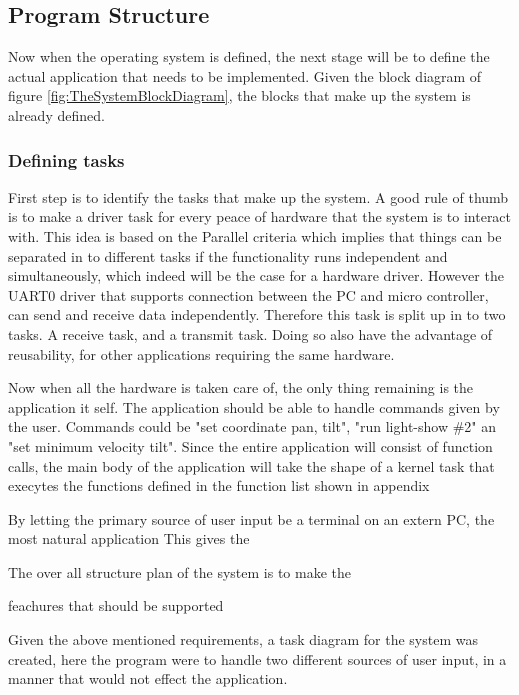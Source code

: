 

\subsection{Program Structure}
\label{sec:ProgramStructure}

Now when the operating system is defined, the next stage will be to define the actual application that needs to be implemented. Given the block diagram of figure \ref{fig:TheSystemBlockDiagram}, the blocks that make up the system is already defined.

\subsubsection{Defining tasks}
\label{sec:DefiningTasks}
First step is to identify the tasks that make up the system. A good rule of thumb is to make a driver task for every peace of hardware that the system is to interact with. This idea is based on the Parallel criteria which implies that things can be separated in to different tasks if the functionality runs independent and simultaneously, which indeed will be the case for a hardware driver. 
However the UART0 driver that supports connection between the PC and micro controller, can send and receive data independently. Therefore this task is split up in to two tasks. A receive task, and a transmit task.
Doing so also have the advantage of reusability, for other applications requiring the same hardware. 

Now when all the hardware is taken care of, the only thing remaining is the application it self. The application should be able to handle commands given by the user. Commands could be "set coordinate pan, tilt", "run light-show \#2" an "set minimum velocity tilt". Since the entire application will consist of function calls, the main body of the application will take the shape of a kernel task that execytes the functions defined in the function list shown in appendix 


By letting the primary source of user input be a terminal on an extern PC, the most natural application 
This gives the 

 The over all structure plan of the system is to make the 

feachures that should be supported 


Given the above mentioned requirements, a task diagram for the system was created, here the program were to handle two different sources of user input, in a manner that would not effect the application. 

